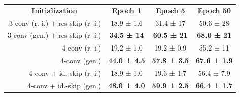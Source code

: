 \documentclass{article}
\begin{document}
\begin{table}
\vspace{-6mm}
\label{tab:cross_architecture}
\vspace{2mm}
\small
\setlength{\tabcolsep}{2pt}
\begin{tabularx}{\linewidth}{rccc}
\toprule
\multicolumn{1}{c}{\textbf{Initialization}} & \multicolumn{1}{c}{\textbf{Epoch 1}} & \multicolumn{1}{c}{\textbf{Epoch 5}} & \multicolumn{1}{c}{\textbf{Epoch 50}} \\ 
\cmidrule(r){1-1} \cmidrule(rl){2-2} \cmidrule(rl){3-3} \cmidrule(rl){4-4}
3-conv (r. i.) + res-skip (r. i.)   & 18.9 ± 1.6                         & 31.4 ± 17                        & 50.6 ± 28                         \\
3-conv (gen.) + res-skip (r. i.)     & \textbf{34.5 ± 14 }              & \textbf{60.5 ± 21 }              & \textbf{68.0 ± 21}                \\
\cmidrule(r){1-1} \cmidrule(rl){2-2} \cmidrule(rl){3-3} \cmidrule(rl){4-4}
4-conv (r. i.)                        & 19.2 ± 1.0                         & 19.2 ± 0.9                         & 55.2 ± 11                         \\
4-conv (gen.)                          & \textbf{44.0 ± 4.5 }               & \textbf{57.8 ± 3.5 }               & \textbf{67.6 ± 1.9 }                \\
\cmidrule(r){1-1} \cmidrule(rl){2-2} \cmidrule(rl){3-3} \cmidrule(rl){4-4}
4-conv + id.-skip (r. i.)        & 18.9 ± 1.0                         & 19.6 ± 1.7                         & 56.4 ± 7.9                          \\
4-conv + id.-skip (gen.)          & \textbf{48.0 ± 4.0 }               & \textbf{59.9 ± 2.5 }               & \textbf{66.4 ± 1.7 }                \\ 
\bottomrule
\end{tabularx}
\vspace{-4mm}
\end{table} 
\end{document}
